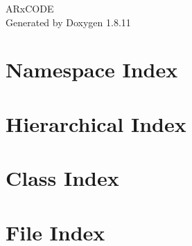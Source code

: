 \documentclass[twoside]{book}
\newcommand{\+}{\discretionary{\mbox{\scriptsize$\hookleftarrow$}}{}{}}
\newcommand{\clearemptydoublepage}{%
  \newpage{\pagestyle{empty}\cleardoublepage}%
}
\begin{document}
\begin{titlepage}
\vspace*{7cm}
\begin{center}%
{\Large A\+Rx\+C\+O\+DE }\\
\vspace*{1cm}
{\large Generated by Doxygen 1.8.11}\\
\end{center}
\end{titlepage}
\clearemptydoublepage
\tableofcontents
\clearemptydoublepage
{}

\chapter{Namespace Index}

\chapter{Hierarchical Index}

\chapter{Class Index}

\chapter{File Index}

\end{document}
